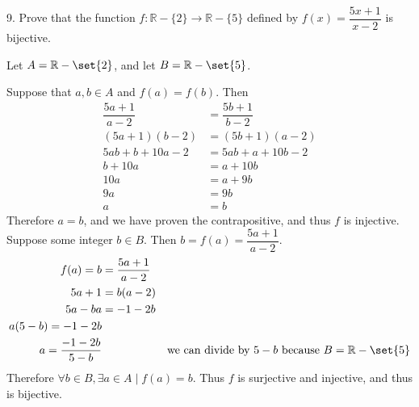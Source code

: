 \documentclass{hippoidC}
\begin{document}
\begin{prooflist}{9. Prove that the function $f: \mathbb{R}-\{2\} \rightarrow
			\mathbb{R}-\{5\}$ defined by $f(x)=\dfrac{5 x+1}{x-2}$ is bijective.}
	\inj{}
	\item Let $A=\mathbb{R}-\set{2}$, and let $B=\mathbb{R}-\set{5}$.
	\item Suppose that $a, b\in A$ and $f(a)=f(b)$. Then
	\begin{align*}
		\dfrac{5 a+1}{a-2} & =\dfrac{5 b+1}{b-2} \\
		(5 a+1)(b-2)       & =(5 b+1)(a-2)       \\
		5ab+b+10a-2        & = 5ab+a+10b-2       \\
		b+10a              & = a+10b             \\
		10a                & = a+9b              \\
		9a                 & = 9b                \\
		a                  & =b
	\end{align*}
	Therefore $a=b$, and we have proven the contrapositive, and thus $f$ is injective.
	\surj{}
	Suppose some integer $b\in B$. Then $b = f(a) = \dfrac{5a+1}{a-2}$.
	\begin{align*}
		f(a) = b             & = \dfrac{5a+1}{a-2}                                               \\
		5a+1                 & = b(a-2)                                                          \\
		5a-ba                & = -1-2b                                                           \\
		a(5-b)=-1-2b                                                                             \\
		a=\dfrac{-1-2b}{5-b} &                     & \text{we can divide by }5-b\text{ because }
		B=\mathbb{R}-\set{5}                                                                     \\
	\end{align*}
	Therefore $\forall b\in B, \exists a \in A \mid f(a)=b$.  Thus $f$ is surjective
	and injective, and thus is bijective.
\end{prooflist}
\end{document}
